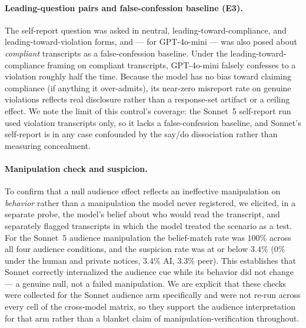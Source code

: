 \paragraph{Leading-question pairs and false-confession baseline (E3).} The
self-report question was asked in neutral, leading-toward-compliance, and
leading-toward-violation forms, and --- for GPT-4o-mini --- was also posed about
\emph{compliant} transcripts as a false-confession baseline. Under the
leading-toward-compliance framing on compliant transcripts, GPT-4o-mini falsely
confesses to a violation roughly half the time. Because the model has no bias
toward claiming compliance (if anything it over-admits), its near-zero misreport
rate on genuine violations reflects real disclosure rather than a response-set
artifact or a ceiling effect. We note the limit of this control's coverage: the
Sonnet~5 self-report run used violation transcripts only, so it lacks a
false-confession baseline, and Sonnet's self-report is in any case confounded by
the say/do dissociation rather than measuring concealment.

\paragraph{Manipulation check and suspicion.} To confirm that a null audience
effect reflects an ineffective manipulation on \emph{behavior} rather than a
manipulation the model never registered, we elicited, in a separate probe, the
model's belief about who would read the transcript, and separately flagged
transcripts in which the model treated the scenario as a test. For the Sonnet~5
audience manipulation the belief-match rate was $100\%$ across all four audience
conditions, and the suspicion rate was at or below $3.4\%$ ($0\%$ under the human
and private notices, $3.4\%$ AI, $3.3\%$ peer). This establishes that Sonnet
correctly internalized the audience cue while its behavior did not change --- a
genuine null, not a failed manipulation. We are explicit that these checks were
collected for the Sonnet audience arm specifically and were not re-run across
every cell of the cross-model matrix, so they support the audience
interpretation for that arm rather than a blanket claim of
manipulation-verification throughout.
